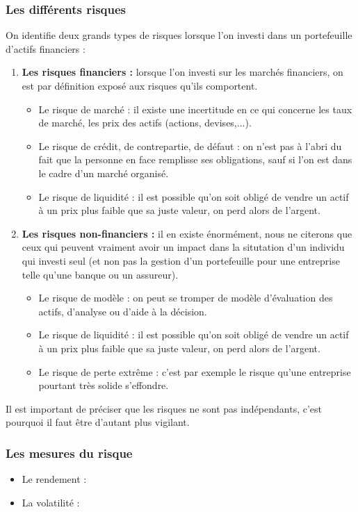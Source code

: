 \subsubsection{Les différents risques}
On identifie deux grands types de risques lorsque l'on investi dans un portefeuille d'actifs financiers :
\begin{enumerate}
 \item \textbf{Les risques financiers :} lorsque l'on investi sur les marchés financiers, on est par définition exposé aux risques qu'ils comportent.
    \begin{itemize}
     \item Le risque de marché : il existe une incertitude en ce qui concerne les taux de marché, les prix des actifs (actions, devises,...).
     \item Le risque de crédit, de contrepartie, de défaut : on n'est pas à l'abri du fait que la personne en face remplisse ses obligations, sauf si l'on est dans le cadre d'un marché organisé.
     \item Le risque de liquidité : il est possible qu'on soit obligé de vendre un actif à un prix plus faible que sa juste valeur, on perd alors de l'argent.
    \end{itemize}
 \item \textbf{Les risques non-financiers :} il en existe énormément, nous ne citerons que ceux qui peuvent vraiment avoir un impact dans la situtation d'un individu qui investi seul (et non pas la gestion d'un portefeuille pour une entreprise telle qu'une banque ou un assureur).
    \begin{itemize}
     \item Le risque de modèle : on peut se tromper de modèle d'évaluation des actifs, d'analyse ou d'aide à la décision.
     \item Le risque de liquidité : il est possible qu'on soit obligé de vendre un actif à un prix plus faible que sa juste valeur, on perd alors de l'argent.
     \item Le risque de perte extrême : c'est par exemple le risque qu'une entreprise pourtant très solide s'effondre.
    \end{itemize}
\end{enumerate}
Il est important de préciser que les risques ne sont pas indépendants, c'est pourquoi il faut être d'autant plus vigilant.

\subsubsection{Les mesures du risque}
\begin{itemize}
 \item Le rendement :
 \item La volatilité :
\end{itemize}



